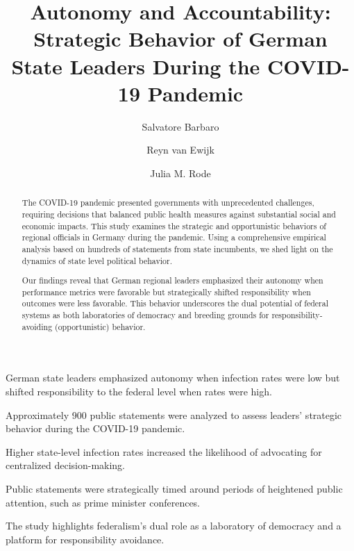 \documentclass[authoryear,12pt, 3p]{elsarticle}
\theoremstyle{break}
\begin{document}
	
\begin{frontmatter}
\title{Autonomy and Accountability: Strategic Behavior of German State Leaders During the COVID-19 Pandemic}
\author[1]{Salvatore Barbaro} 
\author[2]{Reyn van Ewijk}
\author[3]{Julia M. Rode}

		




\begin{abstract}
The COVID-19 pandemic presented governments with unprecedented challenges, requiring decisions that balanced public health measures against substantial social and economic impacts. This study examines the strategic and opportunistic behaviors of regional officials in Germany during the pandemic. Using a comprehensive empirical analysis based on hundreds of statements from state incumbents, we shed light on the dynamics of state level political behavior.

Our findings reveal that German regional leaders emphasized their autonomy when performance metrics were favorable but strategically shifted responsibility when outcomes were less favorable. This behavior underscores the dual potential of federal systems as both laboratories of democracy and breeding grounds for responsibility-avoiding (opportunistic) behavior.
\end{abstract}
		
\begin{highlights}
\item German state leaders emphasized autonomy when infection rates were low but shifted responsibility to the federal level when rates were high.
\item Approximately 900 public statements were analyzed to assess leaders' strategic behavior during the COVID-19 pandemic.
\item Higher state-level infection rates increased the likelihood of advocating for centralized decision-making.
\item Public statements were strategically timed around periods of heightened public attention, such as prime minister conferences.
\item The study highlights federalism's dual role as a laboratory of democracy and a platform for responsibility avoidance.
\end{highlights}
		

\end{frontmatter}
\end{document}
